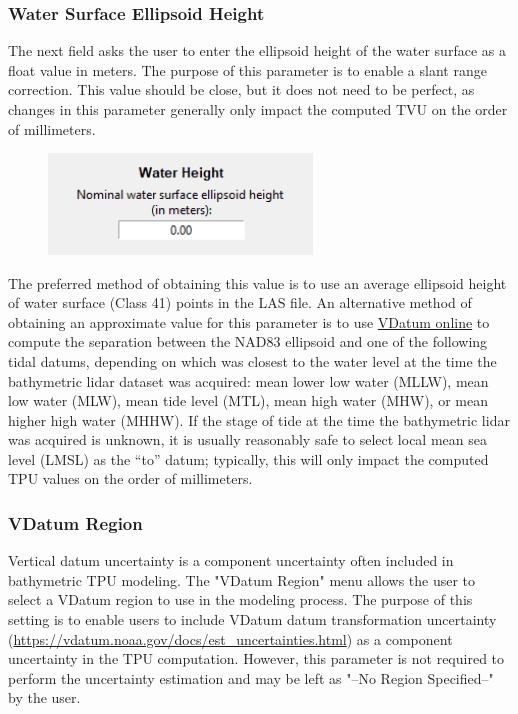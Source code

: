 \documentclass[11pt, a4paper]{article}
\begin{document}
\subsubsection{Water Surface Ellipsoid Height}
The next field asks the user to enter the ellipsoid height of the water surface as a float value in meters. The purpose of this parameter is to enable a slant range correction. This value should be close, but it does not need to be perfect, as changes in this parameter generally only impact the computed TVU on the order of millimeters. 

\begin{figure}[H]
    \centering
    \includegraphics[width=7cm]{figs/cblue_gui_water_height.png}
\end{figure}

 The preferred method of obtaining this value is to use an average ellipsoid height of water surface (Class 41) points in the LAS file. An alternative method of obtaining an approximate value for this parameter is to use \href{https://vdatum.noaa.gov/vdatumweb/}{VDatum online} to compute the separation between the NAD83 ellipsoid and one of the following tidal datums, depending on which was closest to the water level at the time the bathymetric lidar dataset was acquired: mean lower low water (MLLW), mean low water (MLW), mean tide level (MTL), mean high water (MHW), or mean higher high water (MHHW). If the stage of tide at the time the bathymetric lidar was acquired is unknown, it is usually reasonably safe to select local mean sea level (LMSL) as the “to” datum; typically, this will only impact the computed TPU values on the order of millimeters.

\subsubsection{VDatum Region}
Vertical datum uncertainty is a component uncertainty often included in bathymetric TPU modeling. The "VDatum Region" menu allows the user to select a VDatum region to use in the modeling process. The purpose of this setting is to enable users to include VDatum datum transformation uncertainty (\url{https://vdatum.noaa.gov/docs/est_uncertainties.html}) as a component uncertainty in the TPU computation.  However, this parameter is not required to perform the uncertainty estimation and may be left as "--No Region Specified--" by the user.
\end{document}
